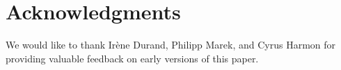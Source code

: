 \section{Acknowledgments} 

We would like to thank Irène Durand, Philipp Marek, and Cyrus Harmon
for providing valuable feedback on early versions of this paper.
